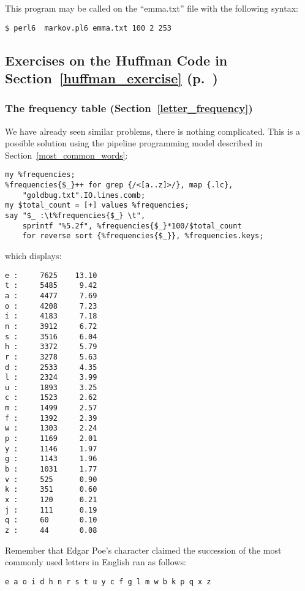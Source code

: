 {This program may be called on the ``emma.txt'' file with 
the following syntax:

\begin{verbatim}
$ perl6  markov.pl6 emma.txt 100 2 253
\end{verbatim}

\subsection{Exercises on the Huffman Code in Section~\ref{huffman_exercise} (p.~\pageref{huffman_exercise})}

\subsubsection{The frequency table (Section~\ref{letter_frequency})}
\label{sol_letter_frequency}

We have already seen similar problems, there is nothing complicated. 
This is a possible solution using the pipeline programming model 
described in Section~\ref{most_common_words}:

\begin{verbatim}
my %frequencies;
%frequencies{$_}++ for grep {/<[a..z]>/}, map {.lc}, 
    "goldbug.txt".IO.lines.comb;
my $total_count = [+] values %frequencies;
say "$_ :\t%frequencies{$_} \t", 
    sprintf "%5.2f", %frequencies{$_}*100/$total_count  
    for reverse sort {%frequencies{$_}}, %frequencies.keys;
\end{verbatim}   

which displays:
\begin{verbatim}
e :     7625    13.10
t :     5485     9.42
a :     4477     7.69
o :     4208     7.23
i :     4183     7.18
n :     3912     6.72
s :     3516     6.04
h :     3372     5.79
r :     3278     5.63
d :     2533     4.35
l :     2324     3.99
u :     1893     3.25
c :     1523     2.62
m :     1499     2.57
f :     1392     2.39
w :     1303     2.24
p :     1169     2.01
y :     1146     1.97
g :     1143     1.96
b :     1031     1.77
v :     525      0.90
k :     351      0.60
x :     120      0.21
j :     111      0.19
q :     60       0.10
z :     44       0.08
\end{verbatim}

Remember that Edgar Poe's character claimed the succession 
of the most commonly used letters in English ran as 
follows:

\begin{verbatim}
e a o i d h n r s t u y c f g l m w b k p q x z
\end{verbatim}

}

